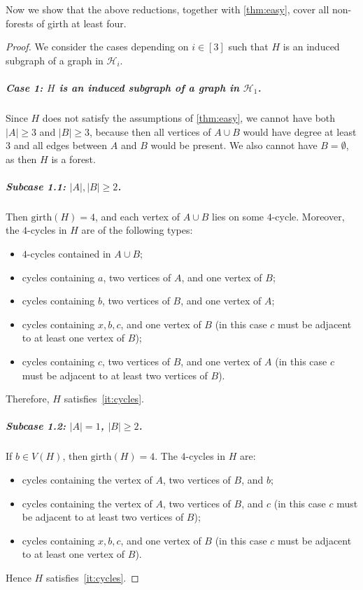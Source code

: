 \documentclass[a4paper,UKenglish,cleveref, autoref, thm-restate]{lipics-v2021}
\newcommand{\girth}{\mathrm{girth}}
\newcommand{\cH}{\mathcal{H}}
\begin{document}
Now we show that the above reductions, together with \cref{thm:easy}, cover all non-forests of girth at least four.

\GirthFourLemmaAll*

\begin{proof}
We consider the cases depending on $i\in [3]$ such that $H$ is an induced subgraph of a graph in $\cH_i$.

\subparagraph*{Case 1: \boldmath $H$ is an induced subgraph of a graph in $\cH_1$.}
Since $H$ does not satisfy the assumptions of \cref{thm:easy}, we cannot have both $|A|\geq 3$ and $|B|\geq 3$, because then all vertices of $A\cup B$ would have degree at least $3$ and all edges between $A$ and $B$ would be present.
We also cannot have $B=\emptyset$, as then $H$ is a forest.

\subparagraph*{Subcase 1.1: \boldmath $|A|,|B|\geq 2$.}
Then $\girth(H)=4$, and each vertex of $A\cup B$ lies on some $4$-cycle.
Moreover, the $4$-cycles in $H$ are of the following types:
\begin{itemize}
    \item $4$-cycles contained in $A\cup B$;
    \item cycles containing $a$, two vertices of $A$, and one vertex of $B$;
    \item cycles containing $b$, two vertices of $B$, and one vertex of $A$;
    \item cycles containing $x,b,c$, and one vertex of $B$ (in this case $c$ must be adjacent to at least one vertex of $B$);
    \item cycles containing $c$, two vertices of $B$, and one vertex of $A$ (in this case $c$ must be adjacent to at least two vertices of $B$).
\end{itemize}
Therefore, $H$ satisfies~\ref{it:cycles}.

\subparagraph*{Subcase 1.2: \boldmath $|A|=1$, $|B|\geq 2$.}
If $b\in V(H)$, then $\girth(H)=4$.
The $4$-cycles in $H$ are:
\begin{itemize}
    \item cycles containing the vertex of $A$, two vertices of $B$, and $b$;
    \item cycles containing the vertex of $A$, two vertices of $B$, and $c$ (in this case $c$ must be adjacent to at least two vertices of $B$);
    \item cycles containing $x,b,c$, and one vertex of $B$ (in this case $c$ must be adjacent to at least one vertex of $B$).
\end{itemize}
Hence $H$ satisfies~\ref{it:cycles}.


\end{proof}
\end{document}
